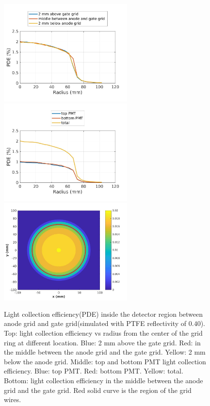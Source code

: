 \begin{figure}[!ht]
  \centering
  \includegraphics[width=0.6\textwidth,clip,trim={0 0 0 170}]
  {Figures/Ch10/PDEvsRadiusPTFE040.jpg}
  \includegraphics[width=0.6\textwidth,clip,trim={0 0 0 170}]
  {Figures/Ch10/PDEvsRadiusPTFE040MiddleTopBottom.jpg}
  \includegraphics[width=0.6\textwidth]
  {Figures/Ch10/PDEvsRadiusPTFE040MiddleCircle.jpg}
  \caption{Light collection efficiency(PDE) inside the detector region between anode grid and gate grid(simulated with PTFE reflectivity of $0.40$). Top: light collection efficiency vs radius from the center of the grid ring at different location. Blue: 2 mm above the gate grid. Red: in the middle between the anode grid and the gate grid. Yellow: 2 mm below the anode grid. Middle: top and bottom PMT light collection efficiency. Blue: top PMT. Red: bottom PMT. Yellow: total. Bottom: light collection efficiency in the middle between the anode grid and the gate grid. Red solid curve is the region of the grid wires. }
  \label{fig: light collection r 040}
\end{figure}


